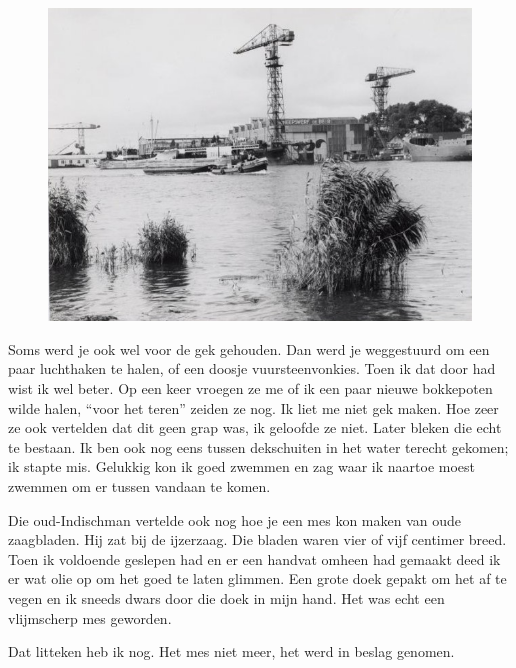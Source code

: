 \documentclass[12pt,twoside, openright]{memoir}
\begin{document}
\begin{figure}
\includegraphics[width=\textwidth]{img/ch15/1964}
\end{figure}

Soms werd je ook wel voor de gek gehouden. Dan werd je weggestuurd om een paar luchthaken te halen, of een doosje vuursteenvonkies. Toen ik dat door had wist ik wel beter. Op een keer vroegen ze me of ik een paar nieuwe bokkepoten wilde halen, ``voor het teren'' zeiden ze nog. Ik liet me niet gek maken. Hoe zeer ze ook vertelden dat dit geen grap was, ik geloofde ze niet. Later bleken die echt te bestaan. Ik ben ook nog eens tussen dekschuiten in het water terecht gekomen; ik stapte mis. Gelukkig kon ik goed zwemmen en zag waar ik naartoe moest zwemmen om er tussen vandaan te komen. 

Die oud-Indischman vertelde ook nog hoe je een mes kon maken van oude zaagbladen. Hij zat bij de ijzerzaag. Die bladen waren vier of vijf centimer breed. Toen ik voldoende geslepen had en er een handvat omheen had gemaakt deed ik er wat olie op om het goed te laten glimmen. Een grote doek gepakt om het af te vegen en ik sneeds dwars door die doek in mijn hand. Het was echt een vlijmscherp mes geworden. 

Dat litteken heb ik nog. Het mes niet meer, het werd in beslag genomen.
\end{document}
